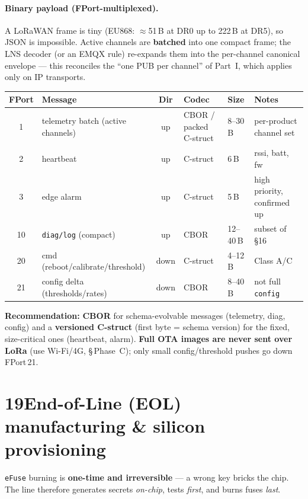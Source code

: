 \paragraph{Binary payload (FPort-multiplexed).}
A LoRaWAN frame is tiny (EU868: $\approx$51\,B at DR0 up to 222\,B at DR5), so JSON is impossible.
Active channels are \textbf{batched} into one compact frame; the LNS decoder (or an EMQX rule)
re-expands them into the per-channel canonical envelope — this reconciles the ``one PUB per channel''
of Part~I, which applies only on IP transports.
\begin{center}
\renewcommand{\arraystretch}{1.18}\small
\begin{tabularx}{\textwidth}{@{}c l c l l X@{}}
\toprule
\textbf{FPort} & \textbf{Message} & \textbf{Dir} & \textbf{Codec} & \textbf{Size} & \textbf{Notes} \\
\midrule
1  & telemetry batch (active channels) & up   & CBOR / packed C-struct & 8--30\,B & per-product channel set \\
2  & heartbeat                         & up   & C-struct               & 6\,B     & rssi, batt, fw \\
3  & edge alarm                        & up   & C-struct               & 5\,B     & high priority, confirmed up \\
10 & \texttt{diag/log} (compact)        & up   & CBOR                   & 12--40\,B& subset of \S16 \\
20 & cmd (reboot/calibrate/threshold)  & down & C-struct               & 4--12\,B & Class A/C \\
21 & config delta (thresholds/rates)   & down & CBOR                   & 8--40\,B & not full \texttt{config} \\
\bottomrule
\end{tabularx}
\end{center}
\noindent\textbf{Recommendation:} \textbf{CBOR} for schema-evolvable messages (telemetry, diag,
config) and a \textbf{versioned C-struct} (first byte = schema version) for the fixed,
size-critical ones (heartbeat, alarm). \textbf{Full OTA images are never sent over LoRa} (use
Wi-Fi/4G, \S\,Phase~C); only small config/threshold pushes go down FPort\,21.

\newpage
\section*{19\quad End-of-Line (EOL) manufacturing \& silicon provisioning}
\texttt{eFuse} burning is \textbf{one-time and irreversible} — a wrong key bricks the chip. The line
therefore generates secrets \emph{on-chip}, tests \emph{first}, and burns fuses \emph{last}.

